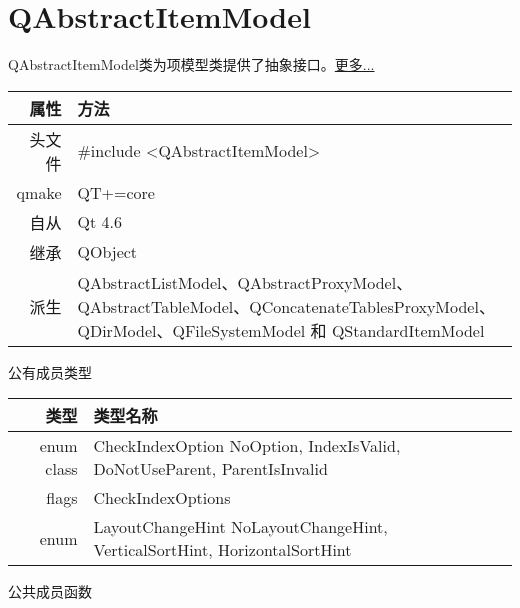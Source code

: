 \chapter{QAbstractItemModel}

QAbstractItemModel类为项模型类提供了抽象接口。\href{https://github.com/JackLovel/QtDocumentCN/blob/master/Src/A/QAbstractItemModel}{更多...} 

\begin{tabular}{|r|l|}
	\hline
	属性 & 方法 \\
	\hline
	头文件 & \#include <QAbstractItemModel>\\      
	\hline
	qmake & QT+=core\\      
	\hline
	自从 & Qt 4.6\\
	\hline
	继承&QObject \\
	\hline
	派生 & QAbstractListModel、QAbstractProxyModel、QAbstractTableModel、QConcatenateTablesProxyModel、QDirModel、QFileSystemModel 和 QStandardItemModel \\
	\hline
\end{tabular}

\splitLine

公有成员类型

\begin{tabular}{|r|l|}
	\hline
	类型 & 类型名称 \\
	\hline
enum class&	CheckIndexOption { NoOption, IndexIsValid, DoNotUseParent,
            ParentIsInvalid }\\
\hline
flags&	CheckIndexOptions\\
\hline
enum&	LayoutChangeHint { NoLayoutChangeHint, VerticalSortHint, HorizontalSortHint }\\
\hline
\end{tabular}

公共成员函数


